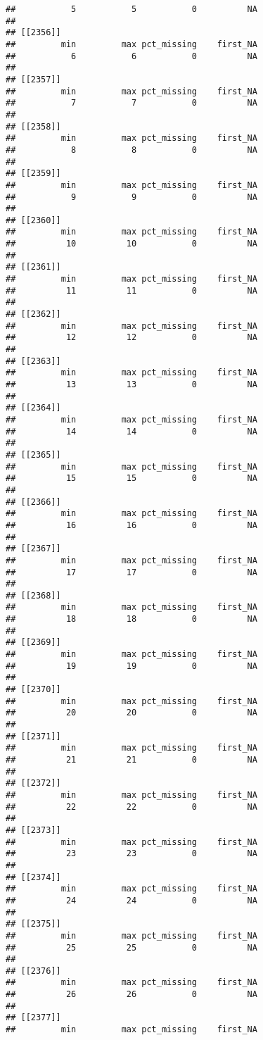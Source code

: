 \documentclass[
]{article}
\begin{document}
\begin{verbatim}
##           5           5           0          NA 
## 
## [[2356]]
##         min         max pct_missing    first_NA 
##           6           6           0          NA 
## 
## [[2357]]
##         min         max pct_missing    first_NA 
##           7           7           0          NA 
## 
## [[2358]]
##         min         max pct_missing    first_NA 
##           8           8           0          NA 
## 
## [[2359]]
##         min         max pct_missing    first_NA 
##           9           9           0          NA 
## 
## [[2360]]
##         min         max pct_missing    first_NA 
##          10          10           0          NA 
## 
## [[2361]]
##         min         max pct_missing    first_NA 
##          11          11           0          NA 
## 
## [[2362]]
##         min         max pct_missing    first_NA 
##          12          12           0          NA 
## 
## [[2363]]
##         min         max pct_missing    first_NA 
##          13          13           0          NA 
## 
## [[2364]]
##         min         max pct_missing    first_NA 
##          14          14           0          NA 
## 
## [[2365]]
##         min         max pct_missing    first_NA 
##          15          15           0          NA 
## 
## [[2366]]
##         min         max pct_missing    first_NA 
##          16          16           0          NA 
## 
## [[2367]]
##         min         max pct_missing    first_NA 
##          17          17           0          NA 
## 
## [[2368]]
##         min         max pct_missing    first_NA 
##          18          18           0          NA 
## 
## [[2369]]
##         min         max pct_missing    first_NA 
##          19          19           0          NA 
## 
## [[2370]]
##         min         max pct_missing    first_NA 
##          20          20           0          NA 
## 
## [[2371]]
##         min         max pct_missing    first_NA 
##          21          21           0          NA 
## 
## [[2372]]
##         min         max pct_missing    first_NA 
##          22          22           0          NA 
## 
## [[2373]]
##         min         max pct_missing    first_NA 
##          23          23           0          NA 
## 
## [[2374]]
##         min         max pct_missing    first_NA 
##          24          24           0          NA 
## 
## [[2375]]
##         min         max pct_missing    first_NA 
##          25          25           0          NA 
## 
## [[2376]]
##         min         max pct_missing    first_NA 
##          26          26           0          NA 
## 
## [[2377]]
##         min         max pct_missing    first_NA 

\end{verbatim}
\end{document}
